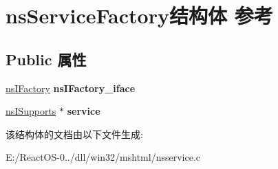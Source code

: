 \hypertarget{structns_service_factory}{}\section{ns\+Service\+Factory结构体 参考}
\label{structns_service_factory}
\subsection*{Public 属性}
\begin{DoxyCompactItemize}
\item 
\mbox{\label{structns_service_factory_a5f3032398a1121ea696bde39e23d2fe8}} 
\hyperlink{interfacens_i_factory}{ns\+I\+Factory} {\bfseries ns\+I\+Factory\+\_\+iface}
\item 
\mbox{\label{structns_service_factory_a33f923d3dd6b7b842c59d94e5fe8f81c}} 
\hyperlink{interfacens_i_supports}{ns\+I\+Supports} $\ast$ {\bfseries service}
\end{DoxyCompactItemize}


该结构体的文档由以下文件生成\+:\begin{DoxyCompactItemize}
\item 
E\+:/\+React\+O\+S-\/0../dll/win32/mshtml/nsservice.\+c\end{DoxyCompactItemize}
